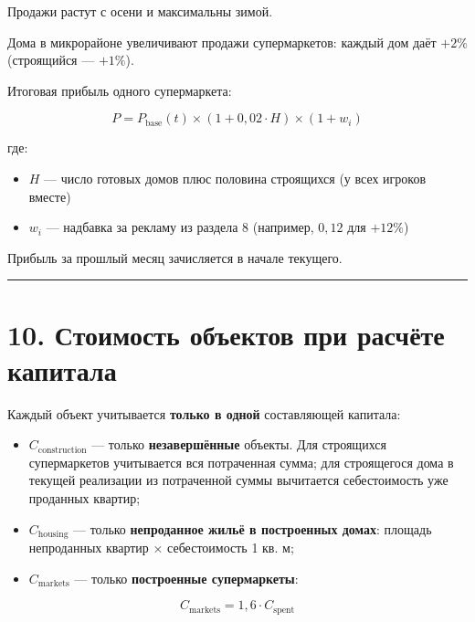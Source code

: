 \documentclass[
]{article}
\providecommand{\tightlist}{%
  \setlength{\itemsep}{0pt}\setlength{\parskip}{0pt}}
\begin{document}
Продажи растут с осени и максимальны зимой.

Дома в микрорайоне увеличивают продажи супермаркетов: каждый дом даёт
\(+2\%\) (строящийся --- \(+1\%\)).

Итоговая прибыль одного супермаркета:

\[
P
=
P_{\text{base}}(t)
\times
\left(
1 + 0{,}02 \cdot H
\right)
\times
\left(
1 + w_i
\right)
\]

где:

\begin{itemize}
\tightlist
\item
  \(H\) --- число готовых домов плюс половина строящихся (у всех игроков
  вместе)
\item
  \(w_i\) --- надбавка за рекламу из раздела 8 (например, \(0{,}12\) для
  \(+12\%\))
\end{itemize}

Прибыль за прошлый месяц зачисляется в начале текущего.

\begin{center}\rule{0.5\linewidth}{0.5pt}\end{center}

\section{10. Стоимость объектов при расчёте
капитала}\label{ux441ux442ux43eux438ux43cux43eux441ux442ux44c-ux43eux431ux44aux435ux43aux442ux43eux432-ux43fux440ux438-ux440ux430ux441ux447ux451ux442ux435-ux43aux430ux43fux438ux442ux430ux43bux430}

Каждый объект учитывается \textbf{только в одной} составляющей капитала:

\begin{itemize}
\tightlist
\item
  \(C_{\text{construction}}\) --- только \textbf{незавершённые} объекты.
  Для строящихся супермаркетов учитывается вся потраченная сумма; для
  строящегося дома в текущей реализации из потраченной суммы вычитается
  себестоимость уже проданных квартир;
\item
  \(C_{\text{housing}}\) --- только \textbf{непроданное жильё в
  построенных домах}: площадь непроданных квартир × себестоимость 1 кв.
  м;
\item
  \(C_{\text{markets}}\) --- только \textbf{построенные супермаркеты}:
\end{itemize}

\[
C_{\text{markets}}
=
1{,}6
\cdot
C_{\text{spent}}
\]
\end{document}
